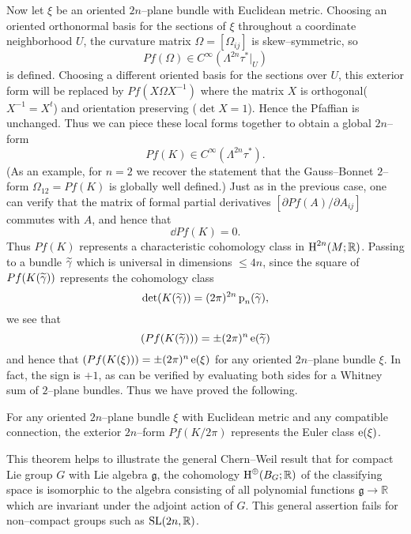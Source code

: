 \documentclass[../main]{subfiles}
\begin{document}
Now let $\xi$ be an oriented $2n$--plane bundle with Euclidean metric. Choosing an oriented orthonormal basis for the sections of $\xi$ throughout a coordinate neighborhood $U$, the curvature matrix $\Omega = [\Omega_{ij}]$ is skew--symmetric, so \[Pf(\Omega) \in C^\infty(\Lambda^{2n} \tau^\ast|_U)\] is defined. Choosing a different oriented basis for the sections over $U$, this exterior form will be replaced by $Pf(X \Omega X^{-1})$ where the matrix $X$ is orthogonal\newline ($X^{-1} = X^t$) and orientation preserving ($\det X = 1$). Hence the Pfaffian is unchanged. Thus we can piece these local forms together to obtain a global $2n$--form \[Pf(K) \in C^\infty(\Lambda^{2n} \tau^\ast).\] (As an example, for $n = 2$ we recover the statement that the Gauss--Bonnet $2$--form $\Omega_{12} = Pf(K)$ is globally well defined.) Just as in the previous case, one can verify that the matrix of formal partial derivatives $[\partial Pf(A)/\partial A_{ij}]$ commutes with $A$, and hence that \[\dd Pf(K) = 0.\] Thus $Pf(K)$ represents a characteristic cohomology class in $\operatorname{H}^{2n}(M; \mathbb R)$. Passing to a bundle ${\xtilde \gamma}$ which is universal in dimensions $\le 4n$, since the square of $Pf(K({\xtilde \gamma}))$ represents the cohomology class \[\det(K({\xtilde \gamma})) = (2\pi)^{2n} \pontrjaginclass_n({\xtilde \gamma}),\] we see that \[(Pf(K({\xtilde \gamma}))) = \pm (2 \pi)^n \eulerclass({\xtilde \gamma})\] and hence that $(Pf(K(\xi))) = \pm (2 \pi)^n \operatorname{e}(\xi)$ for any oriented $2n$--plane bundle $\xi$. In fact, the sign is $+1$, as can be verified by evaluating both sides for a Whitney sum of $2$--plane bundles. Thus we have proved the following.
\begin{theorem*}
For any oriented $2n$--plane bundle $\xi$ with Euclidean metric and any compatible connection, the exterior $2n$--form $Pf(K/2\pi)$ represents the Euler class $\operatorname{e}(\xi)$. 
\end{theorem*} 

\begin{remark*}
This theorem helps to illustrate the general Chern--Weil result that for  compact Lie group $G$ with Lie algebra $\mathfrak g$, the cohomology $\operatorname{H}^\oplus(B_G; \mathbb R)$ of the classifying space is isomorphic to the algebra consisting of all polynomial functions $\mathfrak g \longrightarrow \mathbb R$ which are invariant under the adjoint action of $G$. This general assertion fails for non--compact groups such as $\operatorname{SL}(2n, \mathbb R)$. 
\end{remark*} 
\end{document}
